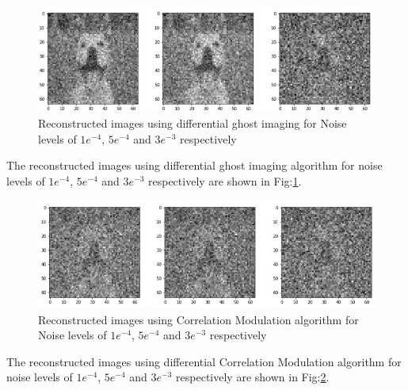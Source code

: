 \documentclass[conference]{IEEEtran}
\begin{document}
\begin{itemize}
    \begin{figure}[ht]
        \centering
        \includegraphics[scale=0.55]{figures/dgi_noise_influence.jpg}
        \caption{Reconstructed images using differential ghost imaging for Noise levels of \(1{e}^{-4}\), \(5{e}^{-4}\) and \(3{e}^{-3}\) respectively}
        \label{fig:dgi_noise_influence}
        \end{figure}
    \par The reconstructed images using differential ghost imaging algorithm for noise levels of \(1{e}^{-4}\), \(5{e}^{-4}\) and \(3{e}^{-3}\) respectively are shown in Fig:\ref{fig:dgi_noise_influence}.
    \bigskip\bigskip\bigskip
    \begin{figure}[ht]
        \centering
        \includegraphics[scale=0.55]{figures/correlationModulation_noise_influence.jpg}
        \caption{Reconstructed images using Correlation Modulation algorithm for Noise levels of \(1{e}^{-4}\), \(5{e}^{-4}\) and \(3{e}^{-3}\) respectively}
        \label{fig:cm_noise_influence}
        \end{figure}
    \par The reconstructed images using differential Correlation Modulation algorithm for noise levels of \(1{e}^{-4}\), \(5{e}^{-4}\) and \(3{e}^{-3}\) respectively are shown in Fig:\ref{fig:cm_noise_influence}.
    

\end{itemize}
\end{document}
